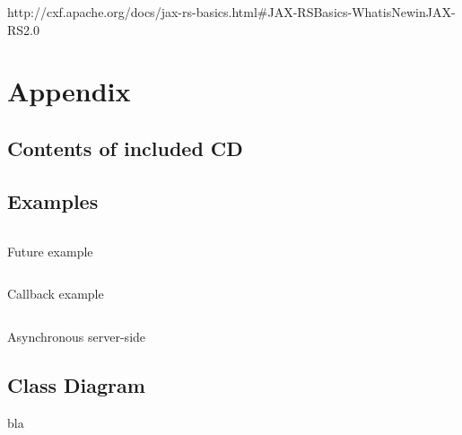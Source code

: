 \documentclass[12pt,final,oneside]{fithesis2}
\begin{document}
\begin{thebibliography}{}
 http://cxf.apache.org/docs/jax-rs-basics.html\#JAX-RSBasics-WhatisNewinJAX-RS2.0

%

%
%




\end{thebibliography}

\endgroup
\appendix

\chapter{Appendix}

\section{Contents of included CD}
\newpage
\section{Examples}
\begin{listing}[ht]
	\inputminted[]{java}{sources/future.java}
	\caption{Future example}
	\label{future}
\end{listing}
\begin{listing}[ht]
	\inputminted[]{java}{sources/callbackClient.java}
	\caption{Callback example}
	\label{callbackClient}
\end{listing}

\begin{listing}[ht]
	\inputminted[]{java}{sources/todo.java}
	\caption{Asynchronous server-side}
	\label{async-server}
\end{listing}
\newpage
\section{Class Diagram}
bla
\end{document}
